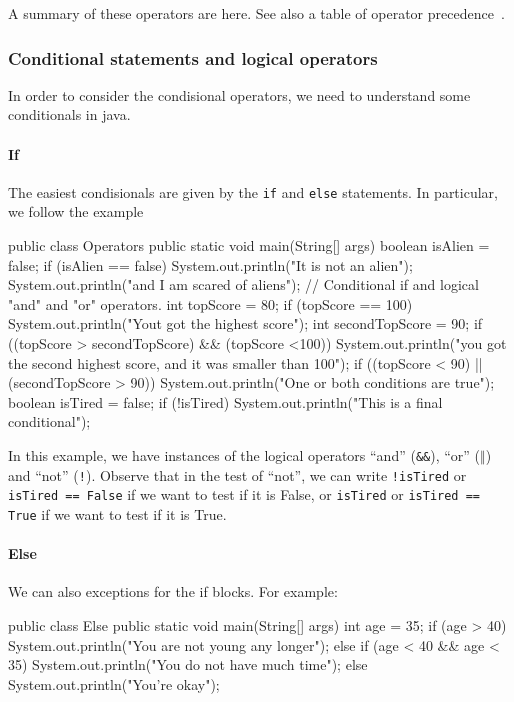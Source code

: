 A summary of these operators are here\cite{oracle}. See also a table of 
operator precedence~\cite{precedence}.

\subsubsection{Conditional statements and logical operators}

In order to consider the condisional operators, we need to understand some conditionals in java. 

\paragraph{If} The easiest condisionals are given by the \verb|if| and \verb|else| 
statements. In particular, we follow the example
\begin{listing}{1}
public class Operators {
    public static void main(String[] args) {
        boolean isAlien = false;
        if (isAlien == false) {
            System.out.println("It is not an alien");
            System.out.println("and I am scared of aliens");
        }
        // Conditional if and logical "and" and "or" operators.
        int topScore = 80;
        if (topScore == 100) {
        System.out.println("Yout got the highest score"); 
        }
        int secondTopScore = 90;
        if ((topScore > secondTopScore) && (topScore <100)) {
            System.out.println("you got the second highest score, 
            and it was smaller than 100");
        }
        if ((topScore < 90) || (secondTopScore > 90)) {
            System.out.println("One or both conditions are true");
        }
        boolean isTired = false;
        if (!isTired) {
            System.out.println("This is a final conditional");
        }
    }
}
\end{listing}
In this example, we have instances of the logical operators ``and'' (\verb|&&|), 
``or'' (\(\Vert\)) and ``not'' (\verb|!|). Observe that in the test of ``not'', we can write
\verb|!isTired| or \verb|isTired == False| if we want to test if it is False, or 
\verb|isTired| or \verb|isTired == True| if we want to test if it is True. 

\paragraph{Else} We can also exceptions for the if blocks. For 
example:
\begin{listing}{1}
public class Else {
    public static void main(String[] args) {
        int age = 35;
        if (age > 40) {
         System.out.println("You are not young any longer"); 
        } else if (age < 40 && age < 35){
        System.out.println("You do not have much time");
        } else {
            System.out.println("You're okay");
        }
    }
}
\end{listing}




